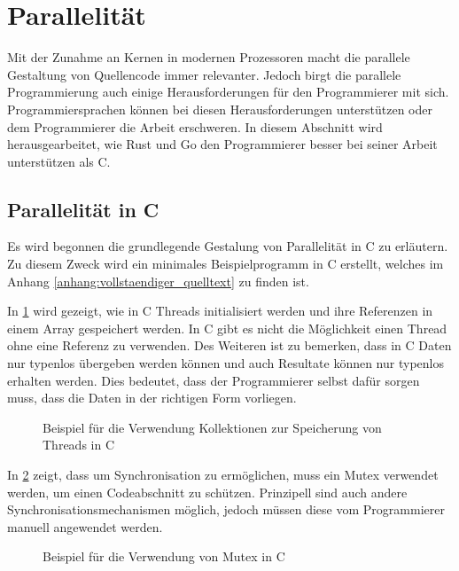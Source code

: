 \section{Parallelität}
\label{sec:Parallelität}

Mit der Zunahme an Kernen in modernen Prozessoren macht die parallele Gestaltung 
von Quellencode immer relevanter. Jedoch birgt die parallele Programmierung
auch einige Herausforderungen für den Programmierer mit sich. Programmiersprachen
können bei diesen Herausforderungen unterstützen oder dem Programmierer die Arbeit
erschweren. In diesem Abschnitt wird herausgearbeitet, wie Rust und Go den
Programmierer besser bei seiner Arbeit unterstützen als C.

\subsection{Parallelität in C}
\label{subsec:Parallelität in C}

Es wird begonnen die grundlegende Gestalung von Parallelität in C zu erläutern.
Zu diesem Zweck wird ein minimales Beispielprogramm in C erstellt, welches im 
Anhang \ref{anhang:vollstaendiger_quelltext} zu finden ist. 

In \cref{fig:datentyp_in_c} wird gezeigt, wie in C Threads initialisiert werden
und ihre Referenzen in einem Array gespeichert werden. In C gibt es nicht die 
Möglichkeit einen Thread ohne eine Referenz zu verwenden. Des Weiteren ist zu 
bemerken, dass in C Daten nur typenlos übergeben werden können und auch Resultate
können nur typenlos erhalten werden. Dies bedeutet, dass der Programmierer
selbst dafür sorgen muss, dass die Daten in der richtigen Form vorliegen. 
\autocite{hawthorneLanguageComparisonParallel}

\begin{figure}[htp]
    \centering
    
    \caption{Beispiel für die Verwendung Kollektionen zur Speicherung von Threads in C}
    \label{fig:datentyp_in_c}
\end{figure}

In \cref{fig:mutex_in_c} zeigt, dass um Synchronisation zu ermöglichen, muss
ein Mutex verwendet werden, um einen Codeabschnitt zu schützen. Prinzipell sind 
auch andere Synchronisationsmechanismen möglich, jedoch müssen diese vom 
Programmierer manuell angewendet werden. 

\begin{figure}[htp]
    \centering
    
    \caption{Beispiel für die Verwendung von Mutex in C}
    \label{fig:mutex_in_c}
\end{figure}


